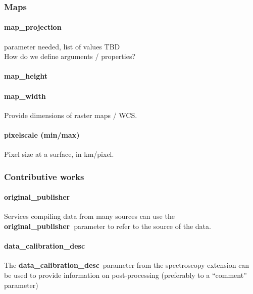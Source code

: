 \documentclass[11pt,a4paper]{ivoa}
\begin{document}
\subsubsection{Maps\\}

\paragraph{map\_projection}

parameter needed, list of values TBD\\How do we define arguments / properties?

\paragraph{map\_height}

\paragraph{map\_width}

Provide dimensions of raster maps / WCS.

\paragraph{pixelscale (min/max)}

Pixel size at a surface, in km/pixel.

\subsubsection{Contributive works\\}

\paragraph{original\_publisher}

Services compiling data from many sources can use the \textbf{original\_publisher }parameter to refer to the source of the data.

\paragraph{data\_calibration\_desc}

The\textbf{ }\textbf{data\_calibration\_desc} parameter from the spectroscopy extension can be used to provide information on post-processing (preferably to a ``comment'' parameter)
\end{document}
